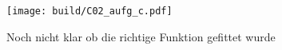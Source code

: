 \begin{figure}
    \centering
    \texttt{[image: build/C02\_aufg\_c.pdf]}
    \caption{Noch nicht klar ob die richtige Funktion gefittet wurde}
    \label{fig:c_plot}
\end{figure}